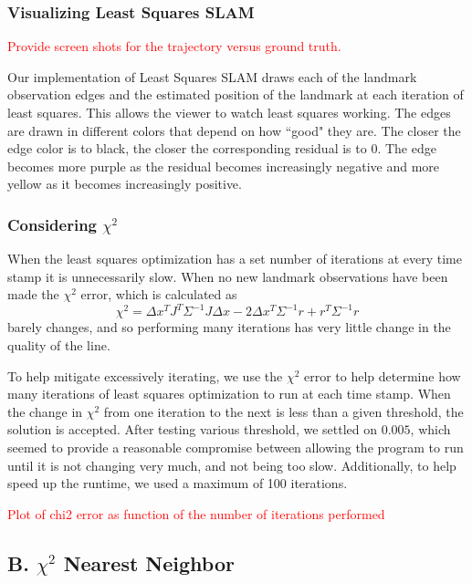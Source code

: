 \documentclass[12pt]{article}
\begin{document}
\subsubsection*{Visualizing Least Squares SLAM}
\textcolor{red}{Provide screen shots for the trajectory versus ground truth.}

Our implementation of Least Squares SLAM draws each of the landmark observation edges and the estimated position of the landmark at each iteration of least squares.  This allows the viewer to watch least squares working. The edges are drawn in different colors that depend on how ``good" they are.  The closer the edge color is to black, the closer the corresponding residual is to 0.  The edge becomes more purple as the residual becomes increasingly negative and more yellow as it becomes increasingly positive.

\subsubsection*{Considering $\chi^2$}
When the least squares optimization has a set number of iterations at every time stamp it is unnecessarily slow.  When no new landmark observations have been made the $\chi^2$ error, which is calculated as  
$$\chi^2 = \Delta x^TJ^T\Sigma^{-1}J\Delta x - 2\Delta x^T\Sigma^{-1}r + r^T\Sigma^{-1}r$$
barely changes, and so performing many iterations has very little change in the quality of the line.

To help mitigate excessively iterating, we use the $\chi^2$ error to help determine how many iterations of least squares optimization to run at each time stamp.  When the change in $\chi^2$ from one iteration to the next is less than a given threshold, the solution is accepted.  After testing various threshold, we settled on $0.005$, which seemed to provide a reasonable compromise between allowing the program to run until it is not changing very much, and not being too slow.  Additionally, to help speed up the runtime, we used a maximum of 100 iterations.

\textcolor{red}{Plot of chi2 error as function of the number of iterations performed}


\subsection*{B. $\chi^2$ Nearest Neighbor}
\end{document}
